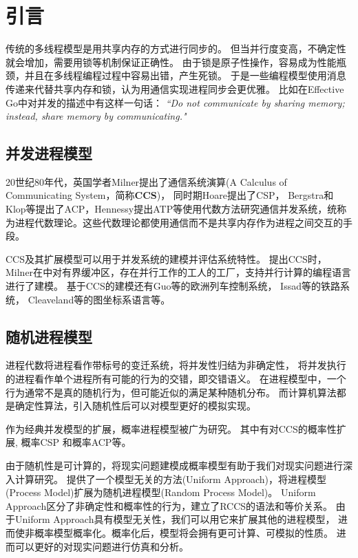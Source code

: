 
\chapter{引言}
   传统的多线程模型是用共享内存的方式进行同步的。
   但当并行度变高，不确定性就会增加，需要用锁等机制保证正确性。
   由于锁是原子性操作，容易成为性能瓶颈，并且在多线程编程过程中容易出错，产生死锁。
   于是一些编程模型使用消息传递来代替共享内存和锁，认为用通信实现进程同步会更优雅。
   比如在Effective Go中对并发的描述中有这样一句话：
   \textit{“Do not communicate by sharing memory; instead, share memory by communicating."}\cite{1}


   \section{并发进程模型}
   20世纪80年代，英国学者Milner提出了通信系统演算(A Calculus of Communicating System，简称\textbf{CCS})\cite{2}，
   同时期Hoare提出了CSP\cite{3}，
   Bergstra和Klop等提出了ACP\cite{4}，Hennessy提出ATP\cite{5}等使用代数方法研究通信并发系统，统称为进程代数理论。这些代数理论都使用通信而不是共享内存作为进程之间交互的手段。
   
   CCS及其扩展模型可以用于并发系统的建模并评估系统特性。
   提出CCS时，Milner在\cite{2}中对有界缓冲区，存在并行工作的工人的工厂，支持并行计算的编程语言进行了建模。
   基于CCS的建模还有Guo等的欧洲列车控制系统\cite{16}，
   Issad等的铁路系统\cite{17}，
   Cleaveland等的图坐标系语言\cite{18}等。

   \section{随机进程模型}

   进程代数将进程看作带标号的变迁系统，将并发性归结为非确定性，
   将并发执行的进程看作单个进程所有可能的行为的交错，即交错语义。
   在进程模型中，一个行为通常不是真的随机行为，但可能近似的满足某种随机分布。
   而计算机算法都是确定性算法，引入随机性后可以对模型更好的模拟实现。

   作为经典并发模型的扩展，概率进程模型被广为研究。
   其中有对CCS的概率性扩展\cite{9,10},
   概率CSP\cite{11} 和概率ACP\cite{12}等。

   由于随机性是可计算的，将现实问题建模成概率模型有助于我们对现实问题进行深入计算研究。
   \cite{7}提供了一个模型无关的方法(Uniform Approach)，将进程模型(Process Model)扩展为随机进程模型(Random Process Model)。
   Uniform Approach区分了非确定性和概率性的行为，建立了RCCS的语法和等价关系。
   由于Uniform Approach具有模型无关性，我们可以用它来扩展其他的进程模型，
   进而使非概率模型概率化。概率化后，模型将会拥有更可计算、可模拟的性质。
   进而可以更好的对现实问题进行仿真和分析。
